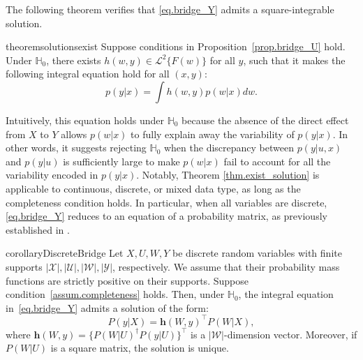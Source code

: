 \documentclass[
  12pt]{article}
\newtheorem{remark}{Remark}
\def\h{\mathbf{h}}
\def\mH{\mathbb{H}}
\def\cL{\mathcal{L}}
\begin{document}
The following theorem verifies that \eqref{eq.bridge_Y} admits a square-integrable solution.
\begin{restatable}{theorem}{solutionsexist}
\label{thm.exist_solution}
Suppose conditions in Proposition~\ref{prop.bridge_U} hold. Under $\mathbb H_0$, there exists $h(w,y) \in \cL^2\{F(w)\}$ for all $y$, such that it makes the following integral equation hold for all $(x,y)$: 
\begin{equation}\label{eq.bridge_Y}
    p(y|x) = \int h(w,y) p(w|x) dw.
\end{equation}
\end{restatable}
Intuitively, this equation holds under $\mH_0$ because the absence of the direct effect from $X$ to $Y$ allows $p(w|x)$ to fully explain away the variability of $p(y|x)$. In other words, it suggests rejecting $\mH_0$ when the discrepancy between $p(y|u,x)$ and $p(y|u)$ is sufficiently large to make $p(w|x)$ fail to account for all the variability encoded in $p(y|x)$. Notably, Theorem \ref{thm.exist_solution} is applicable to continuous, discrete, or mixed data type, as long as the completeness condition holds. In particular, when all variables are discrete, \eqref{eq.bridge_Y} reduces to an equation of a probability matrix, as previously established in \cite{miao2018identifying}.




\begin{restatable}{corollary}{DiscreteBridge}\label{cor:discrete_bridge}
Let $X, U, W, Y$ be discrete random variables with finite supports 
$|\mathcal{X}|, |\mathcal{U}|, |\mathcal{W}|, |\mathcal{Y}|$, respectively. We assume that their probability mass functions are strictly positive on their supports. Suppose condition~\ref{assum.completeness} holds. Then, under $\mH_0$, the integral equation in~\eqref{eq.bridge_Y} admits a solution of the form:
\begin{equation}\label{eq.discrete_bridge_Y}
    P(y | X)=\h(W,y)^\top P(W | X),
\end{equation}
where $\h(W,y) = \{P(W | U)^{\dagger} P(y | U)\}^\top$ is a $|\mathcal{W}|$-dimension vector. Moreover, if $P(W | U)$ is a square matrix, the solution is unique. 
\end{restatable}

\end{document}
